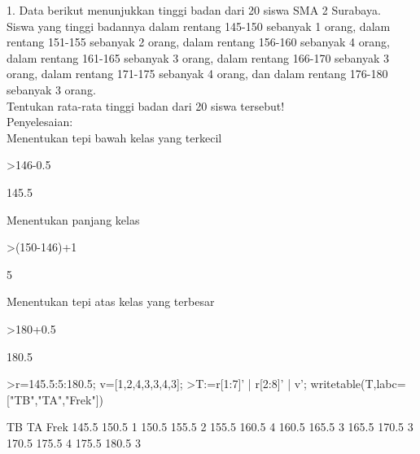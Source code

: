 \documentclass[a4paper,10pt]{article}
\begin{document}
\begin{eulernotebook}
\begin{eulercomment}
\begin{eulercomment}
\begin{eulercomment}
\begin{eulercomment}
\begin{eulercomment}
\begin{eulercomment}
\begin{eulercomment}
\end{eulercomment}
\begin{eulercomment}
1. Data berikut menunjukkan tinggi badan dari 20 siswa SMA 2 Surabaya.\\
Siswa yang tinggi badannya dalam rentang 145-150 sebanyak 1 orang,
dalam rentang 151-155 sebanyak 2 orang, dalam rentang 156-160 sebanyak
4 orang, dalam rentang 161-165 sebanyak 3 orang, dalam rentang 166-170
sebanyak 3 orang, dalam rentang 171-175 sebanyak 4 orang, dan dalam
rentang 176-180 sebanyak 3 orang.\\
Tentukan rata-rata tinggi badan dari 20 siswa tersebut!\\
Penyelesaian:\\
Menentukan tepi bawah kelas yang terkecil
\end{eulercomment}
\begin{eulerprompt}
>146-0.5
\end{eulerprompt}
\begin{euleroutput}
  145.5
\end{euleroutput}
\begin{eulercomment}
Menentukan panjang kelas
\end{eulercomment}
\begin{eulerprompt}
>(150-146)+1
\end{eulerprompt}
\begin{euleroutput}
  5
\end{euleroutput}
\begin{eulercomment}
Menentukan tepi atas kelas yang terbesar
\end{eulercomment}
\begin{eulerprompt}
>180+0.5
\end{eulerprompt}
\begin{euleroutput}
  180.5
\end{euleroutput}
\begin{eulerprompt}
>r=145.5:5:180.5; v=[1,2,4,3,3,4,3];
>T:=r[1:7]' | r[2:8]' | v'; writetable(T,labc=["TB","TA","Frek"])
\end{eulerprompt}
\begin{euleroutput}
          TB        TA      Frek
       145.5     150.5         1
       150.5     155.5         2
       155.5     160.5         4
       160.5     165.5         3
       165.5     170.5         3
       170.5     175.5         4
       175.5     180.5         3
\end{euleroutput}
\begin{eulercomment}

\end{eulercomment}
\end{eulercomment}
\end{eulercomment}
\end{eulercomment}
\end{eulercomment}
\end{eulercomment}
\end{eulercomment}
\end{eulernotebook}
\end{document}
